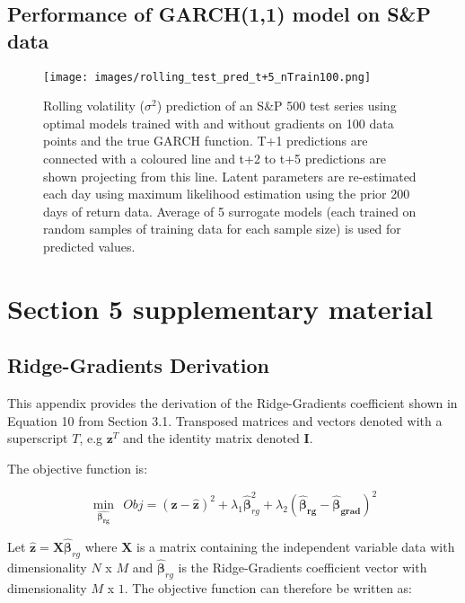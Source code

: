 \documentclass{article}
\begin{document}
\clearpage
\subsection{Performance of GARCH(1,1) model on S\&P data}

\begin{figure}[!h]
	\centering
	\texttt{[image: images/rolling\_test\_pred\_t+5\_nTrain100.png]}
	\caption{Rolling volatility ($\sigma^2$) prediction of an S\&P 500 test series using optimal models trained with and without gradients on 100 data points and the true GARCH function. T+1 predictions are connected with a coloured line and t+2 to t+5 predictions are shown projecting from this line. Latent parameters are re-estimated each day using maximum likelihood estimation using the prior 200 days of return data. Average of 5 surrogate models (each trained on random samples of training data for each sample size) is used for predicted values.}
	\label{GARCH_pred}
\end{figure}

\clearpage
\section{Section 5 supplementary material}
\subsection{Ridge-Gradients Derivation}
\label{rg_derivation}
This appendix provides the derivation of the Ridge-Gradients coefficient shown in Equation 10 from Section 3.1. Transposed matrices and vectors denoted with a superscript $T$, e.g $\mathbf{z}^T$ and the identity matrix denoted $\mathbf{I}$.

The objective function is:

\begin{equation}
	\label{rg_opt2}
	\min_{\hat{\boldsymbol{\beta_{rg}}}} \ \ Obj = (\mathbf{z} -\mathbf{\hat{z}})^2 + \lambda_1 \hat{\boldsymbol{\beta}}_{rg}^2 + \lambda_2 (\boldsymbol{\hat{\beta}_{rg}} - \boldsymbol{\hat{\beta}_{grad}})^2
\end{equation}

Let $\mathbf{\hat{z}} = \mathbf{X}  \hat{\boldsymbol{\beta}}_{rg}$ where $\mathbf{X}$ is a matrix containing the independent variable data with dimensionality $N$ x $M$ and $\hat{\boldsymbol{\beta}}_{rg}$ is the Ridge-Gradients coefficient vector with dimensionality $M$ x $1$.  The objective function can therefore be written as:
\end{document}

